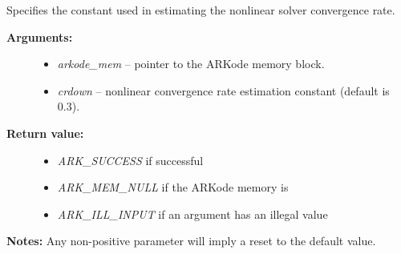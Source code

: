 \documentclass[letterpaper,10pt,english]{sphinxmanual}
\begin{document}
\begin{fulllineitems}
\label{c_interface/User_callable:c.ARKodeSetNonlinCRDown}
Specifies the constant used in estimating the nonlinear solver convergence rate.
\begin{description}
\item[{\textbf{Arguments:}}] \leavevmode\begin{itemize}
\item {} 
\emph{arkode\_mem} -- pointer to the ARKode memory block.

\item {} 
\emph{crdown} -- nonlinear convergence rate estimation constant (default is 0.3).

\end{itemize}

\item[{\textbf{Return value:}}] \leavevmode\begin{itemize}
\item {} 
\emph{ARK\_SUCCESS} if successful

\item {} 
\emph{ARK\_MEM\_NULL} if the ARKode memory is 

\item {} 
\emph{ARK\_ILL\_INPUT} if an argument has an illegal value

\end{itemize}

\end{description}

\textbf{Notes:} Any non-positive parameter will imply a reset to the default value.

\end{fulllineitems}

\end{document}
